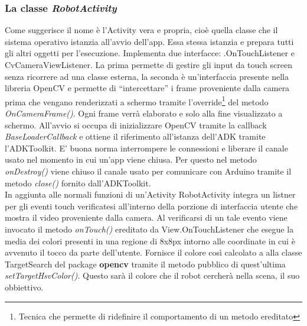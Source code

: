 \subsubsection{La classe \emph{RobotActivity}}
Come suggerisce il nome è l'Activity vera e propria, cioè quella classe che il 
sistema operativo istanzia all'avvio dell'app. Essa stessa istanzia e prepara tutti gli 
altri oggetti per l'esecuzione. Implementa due interfacce: \View.OnTouchListener 
e CvCameraViewListener. 
La prima permette di gestire gli input da touch screen senza ricorrere ad una classe esterna,
la seconda è un'interfaccia presente nella libreria OpenCV e permette di ``intercettare''
i frame proveniente dalla camera prima che vengano renderizzati a schermo tramite 
l'override\footnote{Tecnica che permette di ridefinire il comportamento di un metodo 
ereditato} del metodo \textit{OnCameraFrame()}. Ogni frame verrà elaborato e solo alla
fine visualizzato a schermo.
All'avvio si occupa di inizializzare OpenCV tramite la 
callback \textit{BaseLoaderCallback} e ottiene il riferimento all'istanza dell'ADK
tramite l'ADKToolkit. E' buona norma interrompere le connessioni e liberare il canale usato 
nel momento in cui un'app viene chiusa. Per questo nel metodo \emph{onDestroy()} 
viene chiuso il canale usato per comunicare con Arduino tramite il metodo \emph{close()}
fornito dall'ADKToolkit.\\
In aggiunta alle normali funzioni di un'Activity RobotActivity integra un 
listner per gli eventi touch verificatesi all'interno della porzione di 
interfaccia utente che mostra il video proveniente dalla camera. Al verificarsi di un
tale evento viene invocato il metodo \emph{onTouch()} ereditato da View.OnTouchListener 
che esegue la media dei colori presenti in una regione di 8x8px intorno alle coordinate
in cui è avvenuto il tocco da parte dell'utente. Fornisce il colore così calcolato a 
alla classe TargetSearch del package \textbf{opencv} tramite il metodo pubblico 
di quest'ultima \emph{setTargetHsvColor()}. Questo sarà il colore che il robot cercherà
nella scena, il suo obbiettivo.

